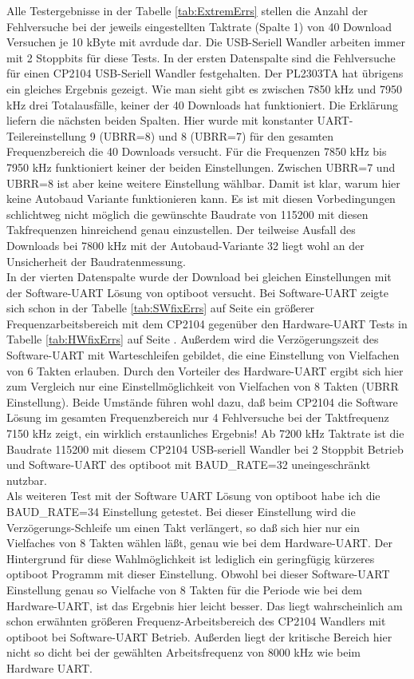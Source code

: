 Alle Testergebnisse in der Tabelle \ref{tab:ExtremErrs} stellen die Anzahl der Fehlversuche
bei der jeweils eingestellten Taktrate (Spalte 1) von 40 Download Versuchen je 10 kByte mit avrdude dar.
Die USB-Seriell Wandler arbeiten immer mit 2 Stoppbits für diese Tests.
In der ersten Datenspalte sind die Fehlversuche für einen CP2104 USB-Seriell Wandler festgehalten.
Der PL2303TA hat übrigens ein gleiches Ergebnis gezeigt.
Wie man sieht gibt es zwischen 7850 kHz und 7950 kHz drei Totalausfälle,
keiner der 40 Downloads hat funktioniert. Die Erklärung liefern die nächsten beiden Spalten.
Hier wurde mit konstanter UART-Teilereinstellung 9 (UBRR=8) und 8 (UBRR=7) für den gesamten 
Frequenzbereich die 40 Downloads versucht. Für die Frequenzen 7850 kHz bis 7950 kHz funktioniert
keiner der beiden Einstellungen. Zwischen UBRR=7 und UBRR=8 ist aber keine weitere Einstellung wählbar.
Damit ist klar, warum hier keine Autobaud Variante funktionieren kann.
Es ist mit diesen Vorbedingungen schlichtweg nicht möglich die gewünschte Baudrate von 115200
mit diesen Takfrequenzen hinreichend genau einzustellen.
Der teilweise Ausfall des Downloads bei 7800 kHz mit der Autobaud-Variante 32 liegt wohl
an der Unsicherheit der Baudratenmessung.\\

In der vierten Datenspalte wurde der Download bei gleichen Einstellungen mit der
Software-UART Lösung von optiboot versucht. Bei Software-UART zeigte sich schon in der
Tabelle \ref{tab:SWfixErrs} auf Seite \pageref{tab:SWfixErrs} ein größerer
Frequenzarbeitsbereich mit dem CP2104 gegenüber den Hardware-UART Tests in Tabelle \ref{tab:HWfixErrs}
auf Seite \pageref{tab:HWfixErrs}. Außerdem wird die Verzögerungszeit des Software-UART
mit Warteschleifen gebildet, die eine Einstellung von Vielfachen von 6 Takten erlauben.
Durch den Vorteiler des Hardware-UART ergibt sich hier zum Vergleich nur eine Einstellmöglichkeit
von Vielfachen von 8 Takten (UBRR Einstellung).
Beide Umstände führen wohl dazu, daß beim CP2104 die Software Lösung im gesamten Frequenzbereich
nur 4 Fehlversuche bei der Taktfrequenz 7150 kHz zeigt, ein wirklich erstaunliches Ergebnis!
Ab 7200 kHz Taktrate ist die Baudrate 115200 mit diesem CP2104 USB-seriell Wandler bei 2 Stoppbit Betrieb
und Software-UART des optiboot mit BAUD\_RATE=32 uneingeschränkt nutzbar.\\

Als weiteren Test mit der Software UART Lösung von optiboot habe ich die BAUD\_RATE=34 Einstellung
getestet. Bei dieser Einstellung wird die Verzögerungs-Schleife um einen Takt verlängert,
so daß sich hier nur ein Vielfaches von 8 Takten wählen läßt, genau wie bei dem Hardware-UART.
Der Hintergrund für diese Wahlmöglichkeit ist lediglich ein geringfügig kürzeres optiboot Programm
mit dieser Einstellung. 
Obwohl bei dieser Software-UART Einstellung genau so Vielfache von 8 Takten für die Periode
wie bei dem Hardware-UART, ist das Ergebnis hier leicht besser. 
Das liegt wahrscheinlich am schon erwähnten größeren Frequenz-Arbeitsbereich des CP2104 Wandlers mit optiboot
bei Software-UART Betrieb.
Außerden liegt der kritische Bereich hier nicht so dicht bei der gewählten Arbeitsfrequenz von 8000 kHz
wie beim Hardware UART.\\

